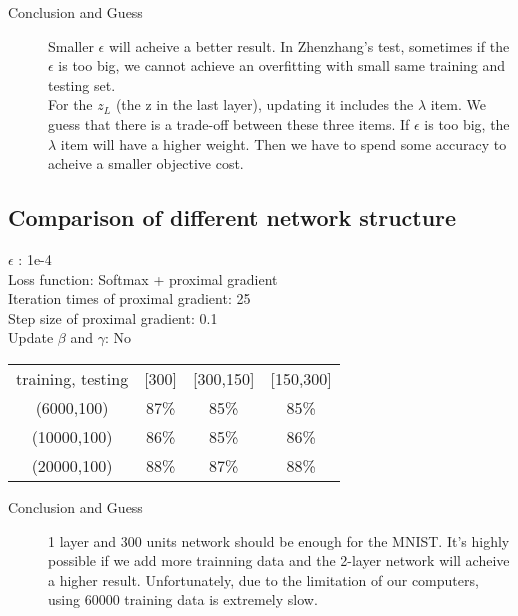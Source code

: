 \documentclass{article}
\begin{document}
\begin{description}
\item[Conclusion and Guess] Smaller $\epsilon$ will acheive a better result. In Zhenzhang's test, sometimes if the $\epsilon$ is too big, we cannot achieve an overfitting with small same training and testing set.\\
For the $z_L$ (the z in the last layer), updating it includes the $\lambda$ item. We guess that there is a trade-off between these three items. If $\epsilon$ is too big, the$\lambda$ item will have a higher weight. Then we have to spend some accuracy to acheive a smaller objective cost.
\end{description}


\subsection{Comparison of different network structure}
\begin{center}
$\epsilon$ : 1e-4\\
Loss function: Softmax + proximal gradient\\
Iteration times of proximal gradient: 25 \\
Step size of proximal gradient: 0.1 \\
Update $\beta$ and $\gamma$:  No\\
\begin{tabular}{c c c c}
	\hline
		{training, testing} & [300] & [300,150] & [150,300] \\
		(6000,100) & 87\% & 85\% & 85\% \\
		(10000,100) & 86\% & 85\% & 86\% \\
		(20000,100) & 88\% & 87\% & 88\% \\
	\hline
	\end{tabular}
\end{center}

\begin{description}
\item[Conclusion and Guess] 1 layer and 300 units network should be enough for the MNIST. It's highly possible if we add more trainning data and the 2-layer network will acheive a higher result. Unfortunately, due to the limitation of our computers, using 60000 training data is extremely slow.
\end{description}
\end{document}
